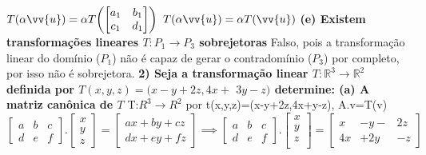 \documentclass[11pt,a4paper]{article}
\newcommand\tab[1][1.835cm]{\hspace*{#1}}
\newcommand\taba[1][2.55cm]{\hspace*{#1}}
\begin{document}
\begin{flushleft}
\taba \hspace{0.4cm} $T( \alpha \vv{u} ) = \alpha T {\begin{pmatrix} {\begin{bmatrix} a_1 & b_1 \\c_1 & d_1 \end{bmatrix} } \end{pmatrix}} $ \linebreak
\taba \hspace{0.4cm} $T(\alpha \vv{u}) = \alpha T(\vv{u})$ \linebreak
\newline
\taba \textbf{(e) Existem transformações lineares $T:P_1 \rightarrow P_3$ sobrejetoras}\linebreak
\taba Falso, pois a transformação linear do domínio ($P_1$) não é capaz de gerar o contradomínio ($P_3$) por completo, por isso não é sobrejetora. 
\newline \newline
\tab \textbf{2) Seja a transformação linear $T:\mathbb{R}^3 \rightarrow \mathbb{R}^2$ definida por $T(x,y,z) = (x-y+2z,4x+ $ $3y-z)$ determine: \linebreak
\taba(a) A matriz canônica de $T$}\linebreak
\taba T:$R^3\rightarrow R^2$ por t(x,y,z)=(x-y+2z,4x+y-z), A.v=T(v)\linebreak
\taba$\begin{bmatrix}
a & b & c\\
d & e & f
\end{bmatrix}.
\begin{bmatrix} 
x\\y\\z
\end{bmatrix}=
\begin{bmatrix}
ax+by+cz\\
dx+ey+fz
\end{bmatrix}\implies\begin{bmatrix}
a & b & c\\
d & e & f
\end{bmatrix}.
\begin{bmatrix}
x\\y\\z\\
\end{bmatrix}=
\begin{bmatrix}
x &-y-&2z\\
4x&+2y&-z
\end{bmatrix}
$\linebreak

\end{flushleft}
\end{document}
